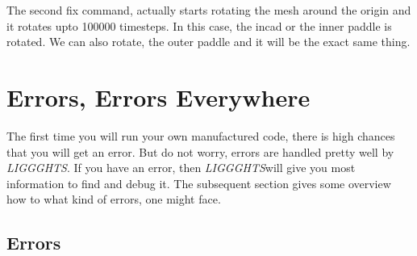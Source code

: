 \documentclass{tufte-book} %
\newcommand{\Li}{\textit{LIGGGHTS}}
\begin{document}
The second fix command, actually starts rotating the mesh around the origin and it rotates upto 100000 timesteps. In this case, the incad or the inner paddle is rotated. We can also rotate, the outer paddle and it will be the exact same thing. 

\section{Errors, Errors Everywhere}
The first time you will run your own manufactured code, there is high chances that you will get an error. But do not worry, errors are handled pretty well by \Li. If you have an error, then \Li will give you most information to find and debug it. The subsequent section gives some overview how to what kind of errors, one might face.
\subsection{Errors}
\end{document}
